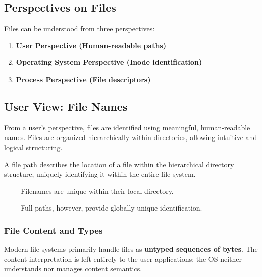 \documentclass[../../compsys.tex]{subfiles}
\begin{document}
\subsection{Perspectives on Files}
Files can be understood from three perspectives:
\begin{enumerate}
    \item \textbf{User Perspective (Human-readable paths)}
    \item \textbf{Operating System Perspective (Inode identification)}
    \item \textbf{Process Perspective (File descriptors)}
\end{enumerate}
\newpage

\subsection{User View: File Names}
From a user's perspective, files are identified using meaningful, human-readable names. Files are organized hierarchically within directories, allowing intuitive and logical structuring.\\[5px]
\begin{definition}
A file path describes the location of a file within the hierarchical directory structure, uniquely identifying it within the entire file system.
\begin{itemize}
    \item[-] Filenames are unique within their local directory.
    \item[-] Full paths, however, provide globally unique identification.
\end{itemize}
\end{definition}

\subsubsection{File Content and Types}
Modern file systems primarily handle files as \textbf{untyped sequences of bytes}. The content interpretation is left entirely to the user applications; the OS neither understands nor manages content semantics.
\end{document}
